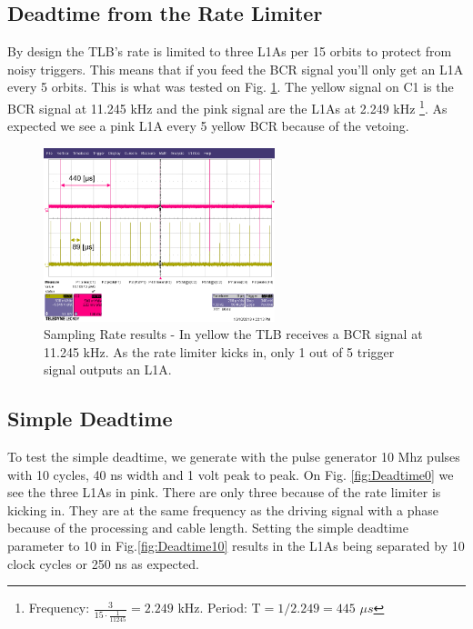\subsection{Deadtime from the Rate Limiter}

By design the TLB's rate is limited to three L1As per 15 orbits to protect from noisy triggers. This means that if you feed the BCR signal you'll only get an L1A every 5 orbits. This is what was tested on Fig. \ref{fig:SamplingRate}. The yellow signal on C1 is the BCR signal at 11.245 kHz and the pink signal are the L1As at 2.249 kHz \footnote{Frequency: $\frac{3}{15\cdot\frac{1}{11245}}=2.249$ kHz. Period: T$=1/2.249 = 445$ $\mu s$}. As expected we see a pink L1A every 5 yellow BCR because of the vetoing.

\begin{figure}[htbp!] 
\centering    
\includegraphics[width=0.6\textwidth]{SamplingRate.png}
\caption[Sampling Rate results]{Sampling Rate results - In yellow the TLB receives a BCR signal at 11.245 kHz. As the rate limiter kicks in, only 1 out of 5 trigger signal outputs an L1A.}
\label{fig:SamplingRate}
\end{figure}

\subsection{Simple Deadtime}

To test the simple deadtime, we generate with the pulse generator 10 Mhz pulses with 10 cycles, 40 ns width and 1 volt peak to peak. On Fig. \ref{fig:Deadtime0} we see the three L1As in pink. There are only three because of the rate limiter is kicking in. They are at the same frequency as the driving signal with a phase because of the processing and cable length. Setting the simple deadtime parameter to 10 in Fig.\ref{fig:Deadtime10} results in the L1As being separated by 10 clock cycles or 250 ns as expected.

